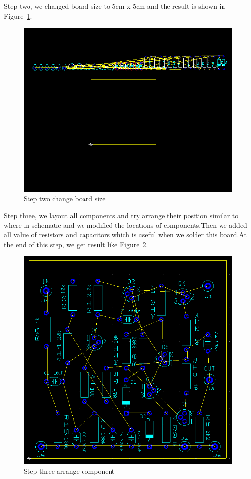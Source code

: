 Step two, we changed board size to 5cm x 5cm and the result is shown in Figure~\ref{fig:Step two change board size}.
\begin{figure}[htbp]
	\centering
	\includegraphics[scale=0.7]{"../Photo/Chap6/step_two_change_board_size"}
	\caption{Step two change board size}
	\label{fig:Step two change board size}
\end{figure}

Step three, we layout all components and try arrange their position similar to where in schematic and we modified the locations of components.Then we added all value of resistors and capacitors which is useful when we solder this board.At the end of this step, we get result like Figure~\ref{fig:Step three arrange component}.
\begin{figure}[htbp]
	\centering
	\includegraphics[scale=0.7]{"../Photo/Chap6/step_sthree_arrange_components"}
	\caption{Step three arrange component}
	\label{fig:Step three arrange component}
\end{figure}


